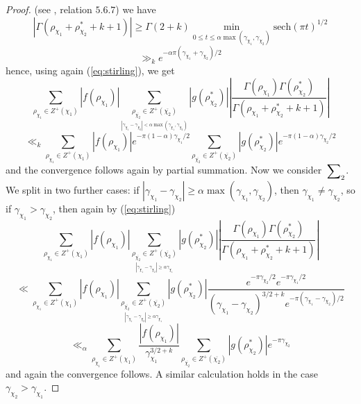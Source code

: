 \documentclass[10pt,a4paper]{amsart}
\numberwithin{equation}{section}
\numberwithin{figure}{section}
\begin{document}
\begin{proof}
(see \cite{O2010}, relation $5.6.7$) we have
\[
\left|\Gamma\left(\rho_{\chi_{1}}+\rho_{\chi_{2}}^{*}+k+1\right)\right|\geq\Gamma\left(2+k\right)\min_{0\leq t\leq\alpha\max\left(\gamma_{\chi_{1}},\gamma_{\chi_{2}}\right)}\text{sech}\left(\pi t\right)^{1/2}
\]
\[
\gg_{k}e^{-\alpha\pi\left(\gamma_{\chi_{1}}+\gamma_{\chi_{2}}\right)/2}
\]
hence, using again (\ref{eq:stirling}), we get
\[
\sum_{\rho_{\chi_{1}}\in Z^{+}\left(\chi_{1}\right)}\left|f\left(\rho_{\chi_{1}}\right)\right|\sum_{\underset{{\scriptstyle \left|\gamma_{\chi_{1}}-\gamma_{\chi_{2}}\right|<\alpha\max\left(\gamma_{\chi_{1}},\gamma_{\chi_{2}}\right)}}{\rho_{\overline{\chi_{2}}}\in Z^{+}\left(\overline{\chi_{2}}\right)}}\left|g\left(\rho_{\chi_{2}}^{*}\right)\right|\left|\frac{\Gamma\left(\rho_{\chi_{1}}\right)\Gamma\left(\rho_{\chi_{2}}^{*}\right)}{\Gamma\left(\rho_{\chi_{1}}+\rho_{\chi_{2}}^{*}+k+1\right)}\right|
\]
\[
\ll_{k}\sum_{\rho_{\chi_{1}}\in Z^{+}\left(\chi_{1}\right)}\left|f\left(\rho_{\chi_{1}}\right)\right|e^{-\pi\left(1-\alpha\right)\gamma_{\chi_{1}}/2}\sum_{\rho_{\overline{\chi_{2}}}\in Z^{+}\left(\overline{\chi_{2}}\right)}\left|g\left(\rho_{\chi_{2}}^{*}\right)\right|e^{-\pi\left(1-\alpha\right)\gamma_{\chi_{2}}/2}
\]
and the convergence follows again by partial summation. Now we consider
$\sideset{}{_{2}}\sum$. We split in two further cases: if $\left|\gamma_{\chi_{1}}-\gamma_{\chi_{2}}\right|\geq\alpha\max\left(\gamma_{\chi_{1}},\gamma_{\chi_{2}}\right)$,
then $\gamma_{\chi_{1}}\neq\gamma_{\chi_{2}}$, so if $\gamma_{\chi_{1}}>\gamma_{\chi_{2}}$,
then again by (\ref{eq:stirling})
\[
\sum_{\rho_{\chi_{1}}\in Z^{+}\left(\chi_{1}\right)}\left|f\left(\rho_{\chi_{1}}\right)\right|\sum_{\underset{{\scriptstyle \left|\gamma_{\chi_{1}}-\gamma_{\chi_{2}}\right|\geq\alpha\gamma_{\chi_{1}}}}{\rho_{\overline{\chi_{2}}}\in Z^{+}\left(\overline{\chi_{2}}\right)}}\left|g\left(\rho_{\chi_{2}}^{*}\right)\right|\left|\frac{\Gamma\left(\rho_{\chi_{1}}\right)\Gamma\left(\rho_{\chi_{2}}^{*}\right)}{\Gamma\left(\rho_{\chi_{1}}+\rho_{\chi_{2}}^{*}+k+1\right)}\right|
\]
\[
\ll\sum_{\rho_{\chi_{1}}\in Z^{+}\left(\chi_{1}\right)}\left|f\left(\rho_{\chi_{1}}\right)\right|\sum_{\underset{{\scriptstyle \left|\gamma_{\chi_{1}}-\gamma_{\chi_{2}}\right|\geq\alpha\gamma_{\chi_{1}}}}{\rho_{\overline{\chi_{2}}}\in Z^{+}\left(\overline{\chi_{2}}\right)}}\left|g\left(\rho_{\chi_{2}}^{*}\right)\right|\frac{e^{-\pi\gamma_{\chi_{2}}/2}e^{-\pi\gamma_{\chi_{1}}/2}}{\left(\gamma_{\chi_{1}}-\gamma_{\chi_{2}}\right)^{3/2+k}e^{-\pi\left(\gamma_{\chi_{1}}-\gamma_{\chi_{2}}\right)/2}}
\]
\[
\ll_{\alpha}\sum_{\rho_{\chi_{1}}\in Z^{+}\left(\chi_{1}\right)}\frac{\left|f\left(\rho_{\chi_{1}}\right)\right|}{\gamma_{\chi_{1}}^{3/2+k}}\sum_{\rho_{\overline{\chi_{2}}}\in Z^{+}\left(\overline{\chi_{2}}\right)}\left|g\left(\rho_{\chi_{2}}^{*}\right)\right|e^{-\pi\gamma_{\chi_{2}}}
\]
and again the convergence follows. A similar calculation holds in
the case $\gamma_{\chi_{2}}>\gamma_{\chi_{1}}$. 
\end{proof}
\end{document}
